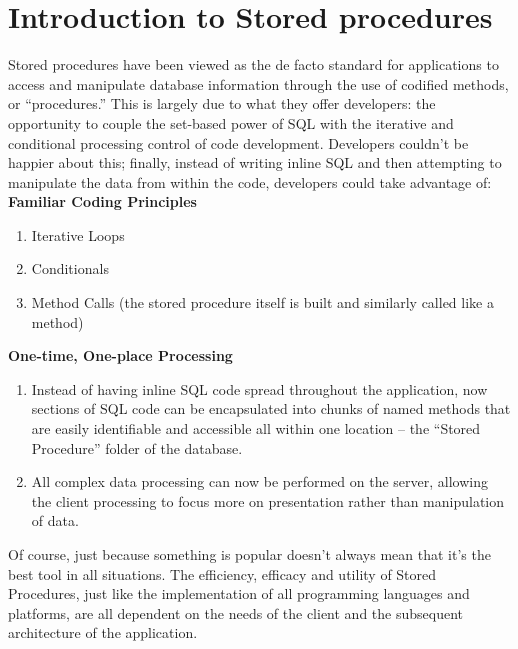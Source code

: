 \section*{Introduction to Stored procedures}

Stored procedures have been viewed as the de facto standard for applications to access and manipulate database information through the use of codified methods, or “procedures.” This is largely due to what they offer developers: the opportunity to couple the set-based power of SQL with the iterative and conditional processing control of code development. Developers couldn’t be happier about this; finally, instead of writing inline SQL and then attempting to manipulate the data from within the code, developers could take advantage of:\\
\textbf{Familiar Coding Principles}
\begin{enumerate}
\item Iterative Loops
\item Conditionals
\item Method Calls (the stored procedure itself is built and similarly called like a method)
\end{enumerate}
\textbf{One-time, One-place Processing}
\begin{enumerate}
\item Instead of having inline SQL code spread throughout the application, now sections of SQL code can be encapsulated into chunks of named methods that are easily identifiable and accessible all within one location – the “Stored Procedure” folder of the database.
\item All complex data processing can now be performed on the server, allowing the client processing to focus more on presentation rather than manipulation of data.
\end{enumerate}

Of course, just because something is popular doesn’t always mean that it’s the best tool in all situations. The efficiency, efficacy and utility of Stored Procedures, just like the implementation of all programming languages and platforms, are all dependent on the needs of the client and the subsequent architecture of the application.



\clearpage